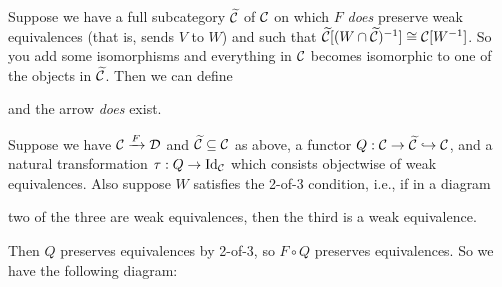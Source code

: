 \documentclass[../MH_Total.tex]{subfiles}
\begin{document}
Suppose we have a full subcategory $\widetilde{\mathcal{C}}$ of $\mathcal{C}$ on which $F$ \emph{does} preserve weak equivalences (that is, sends $V$ to $W$) and such that $\widetilde{\mathcal{C}}[(W \cap \widetilde{\mathcal{C}})^{-1}] \cong \mathcal{C}[W^{-1}]$. So you add some isomorphisms and everything in $\mathcal{C}$ becomes isomorphic to one of the objects in $\widetilde{\mathcal{C}}$. Then we can define
\begin{center}
\end{center}
and the arrow \emph{does} exist. 

\begin{theorem}\label{Right_Kan_Extension}
	Suppose we have $\mathcal{C} \xrightarrow{F} \mathcal{D}$ and $\widetilde{\mathcal{C}} \subseteq \mathcal{C}$ as above, a functor $Q: \mathcal{C} \to \widetilde{\mathcal{C}} \hookrightarrow \mathcal{C}$, and a natural transformation $\tau: Q \to \operatorname{Id}_{\mathcal{C}}$ which consists objectwise of weak equivalences.
	Also suppose $W$ satisfies the 2-of-3 condition, i.e., if in a diagram
	\begin{center}
	\end{center}
	two of the three are weak equivalences, then the third is a weak equivalence.

	Then $Q$ preserves equivalences by 2-of-3, so $F \circ Q$ preserves equivalences. So we have the following diagram:
	\begin{center}
	\end{center}
\end{theorem}
\end{document}
